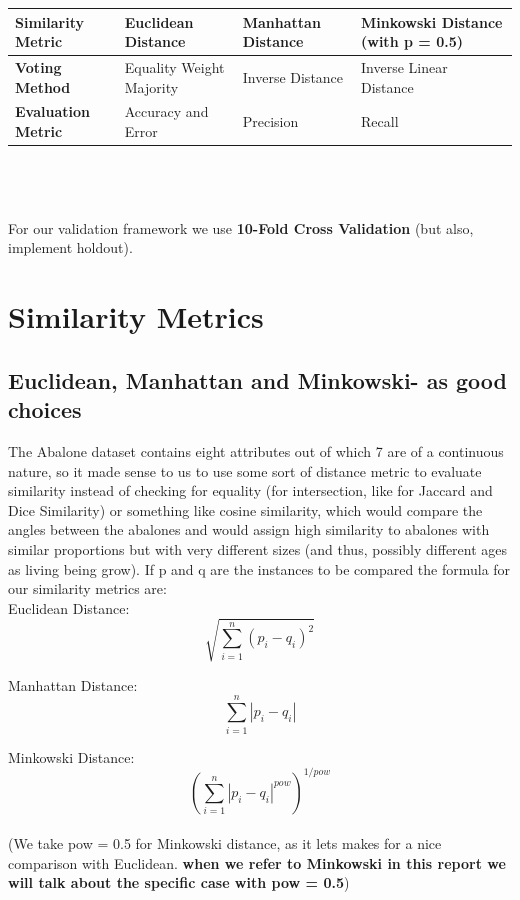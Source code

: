 {\centering
\begin{tabular}{|p{3.5cm}||p{3.5cm}|p{3.5cm}|p{3.75cm}|}
 \hline
 {\bf Similarity Metric} & Euclidean Distance & Manhattan Distance & Minkowski Distance (with p = 0.5)\\
 \hline
 {\bf Voting Method} & Equality Weight Majority & Inverse Distance & Inverse Linear Distance \\ 
 \hline
 {\bf Evaluation Metric} & Accuracy and Error & Precision & Recall \\ 
 \hline
\end{tabular} }
\\\\ \\
For our validation framework we use {\bf 10-Fold Cross Validation} (but also, implement holdout). 

 

\section{Similarity Metrics}

\subsection{Euclidean, Manhattan and Minkowski- as good choices}

The Abalone dataset contains eight attributes out of which 7 are of a continuous nature, so it made sense to us to use some sort of distance metric to evaluate similarity instead of checking for equality  (for intersection, like for Jaccard and Dice Similarity) or something like cosine similarity, which would compare the angles between the abalones and would assign high similarity to abalones with similar proportions but with very different sizes (and thus, possibly different ages as living being grow). If p and q are the instances to be compared the formula for our similarity metrics are: \\

Euclidean Distance:
\begin{equation}
\sqrt{\sum_{i=1}^{n} (p_{i} - q_{i})^{2}}
\end{equation}

Manhattan Distance:
\begin{equation}
\sum_{i=1}^{n} |p_{i} - q_{i}|
\end{equation}

Minkowski Distance:
\begin{equation}
{(\sum_{i=1}^{n} {|p_{i} - q_{i}|}^{pow})}^{1/pow}
\end{equation}
\\
(We take pow = 0.5 for Minkowski distance, as it lets makes for a nice comparison with Euclidean. {\bf when we refer to Minkowski in this report we will talk about the specific case with pow = 0.5}) \\

